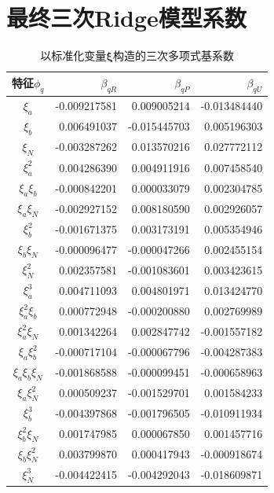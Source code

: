 \documentclass[UTF8,12pt,a4paper]{ctexart}
\renewcommand{\arraystretch}{1.17}
\begin{document}
\section{最终三次Ridge模型系数}
\begin{table}[H]\centering\scriptsize
\renewcommand{\arraystretch}{1.02}
\caption{以标准化变量$\bm\xi$构造的三次多项式基系数}
\begin{tabular}{crrr}
\toprule
特征$\phi_q$&$\beta_{qR}$&$\beta_{qP}$&$\beta_{qU}$\\\midrule
$\xi_a$&-0.009217581&0.009005214&-0.013484440\\
$\xi_b$&0.006491037&-0.015445703&0.005196303\\
$\xi_N$&-0.003287262&0.013570216&0.027772112\\
$\xi_a^2$&0.004286390&0.004911916&0.007458540\\
$\xi_a\xi_b$&-0.000842201&0.000033079&0.002304785\\
$\xi_a\xi_N$&-0.002927152&0.008180590&0.002926057\\
$\xi_b^2$&-0.001671375&0.003173191&0.005354946\\
$\xi_b\xi_N$&-0.000096477&-0.000047266&0.002455154\\
$\xi_N^2$&0.002357581&-0.001083601&0.003423615\\
$\xi_a^3$&0.004711093&0.004801971&0.013424770\\
$\xi_a^2\xi_b$&0.000772948&-0.000200880&0.002769989\\
$\xi_a^2\xi_N$&0.001342264&0.002847742&-0.001557182\\
$\xi_a\xi_b^2$&-0.000717104&-0.000067796&-0.004287383\\
$\xi_a\xi_b\xi_N$&-0.001868588&-0.000099451&-0.000658963\\
$\xi_a\xi_N^2$&0.000509237&-0.001529701&0.001584233\\
$\xi_b^3$&-0.004397868&-0.001796505&-0.010911934\\
$\xi_b^2\xi_N$&0.001747985&0.000067850&0.001457716\\
$\xi_b\xi_N^2$&0.003799870&0.000417943&-0.000918674\\
$\xi_N^3$&-0.004422415&-0.004292043&-0.018609871\\
\bottomrule
\end{tabular}
\end{table}
\end{document}
